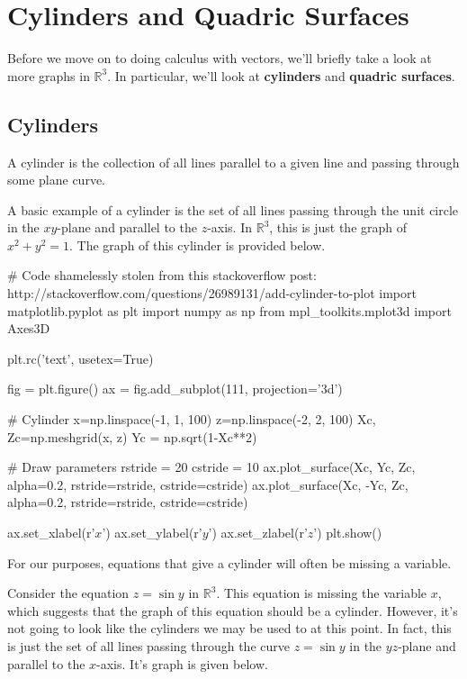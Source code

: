 \documentclass[10pt,]{book}
\newcommand{\terminology}[1]{\textbf{#1}}
\theoremstyle{ptxplainnotitle}
\theoremstyle{ptxplaintitle}
\theoremstyle{ptxplainnotitle}
\theoremstyle{ptxplaintitle}
\theoremstyle{ptxplainnotitle}
\theoremstyle{ptxplaintitle}
\theoremstyle{ptxdefinitionnotitle}
\theoremstyle{ptxdefinitiontitle}
\theoremstyle{ptxdefinitionnotitle}
\theoremstyle{ptxdefinitiontitle}
\theoremstyle{ptxdefinitionnotitle}
\theoremstyle{ptxdefinitiontitle}
\theoremstyle{ptxdefinitionnotitle}
\theoremstyle{ptxdefinitiontitle}
\theoremstyle{ptxdefinitionnotitle}
\theoremstyle{ptxdefinitiontitle}
\numberwithin{equation}{section}
\newcommand{\RR}{\mathbb{R}}
\begin{document}
\section[{Cylinders and Quadric Surfaces}]{Cylinders and Quadric Surfaces}\label{section-cylinders-and-quadric-surfaces}
\hypertarget{p-891}{}%
Before we move on to doing calculus with vectors, we'll briefly take a look at more graphs in \(\RR^{3}\). In particular, we'll look at \terminology{cylinders} and \terminology{quadric surfaces}.%
\typeout{************************************************}
\typeout{************************************************}
\subsection[{Cylinders}]{Cylinders}\label{subsection-cylinders}
\begin{definition}[{Cylinders.}]\label{definition-cylinders}
\hypertarget{p-892}{}%
A cylinder is the collection of all lines parallel to a given line and passing through some plane curve.%
\end{definition}
\hypertarget{p-893}{}%
A basic example of a cylinder is the set of all lines passing through the unit circle in the \(xy\)-plane and parallel to the \(z\)-axis. In \(\RR^{3}\), this is just the graph of \(x^{2}+y^{2}=1\). The graph of this cylinder is provided below.%
\begin{sageinput}
# Code shamelessly stolen from this stackoverflow post: http://stackoverflow.com/questions/26989131/add-cylinder-to-plot
import matplotlib.pyplot as plt
import numpy as np
from mpl_toolkits.mplot3d import Axes3D

plt.rc('text', usetex=True)

fig = plt.figure()
ax = fig.add_subplot(111, projection='3d')

# Cylinder
x=np.linspace(-1, 1, 100)
z=np.linspace(-2, 2, 100)
Xc, Zc=np.meshgrid(x, z)
Yc = np.sqrt(1-Xc**2)

# Draw parameters
rstride = 20
cstride = 10
ax.plot_surface(Xc, Yc, Zc, alpha=0.2, rstride=rstride, cstride=cstride)
ax.plot_surface(Xc, -Yc, Zc, alpha=0.2, rstride=rstride, cstride=cstride)

ax.set_xlabel(r'$x$')
ax.set_ylabel(r'$y$')
ax.set_zlabel(r'$z$')
plt.show()
\end{sageinput}
\hypertarget{p-894}{}%
For our purposes, equations that give a cylinder will often be missing a variable.%
\begin{example}\label{example-a-sinusoidal-cylinder}
\hypertarget{p-895}{}%
Consider the equation \(z = \sin y\) in \(\RR^{3}\). This equation is missing the variable \(x\), which suggests that the graph of this equation should be a cylinder. However, it's not going to look like the cylinders we may be used to at this point. In fact, this is just the set of all lines passing through the curve \(z=\sin y\) in the \(yz\)-plane and parallel to the \(x\)-axis. It's graph is given below.%
\end{example}
\end{document}
